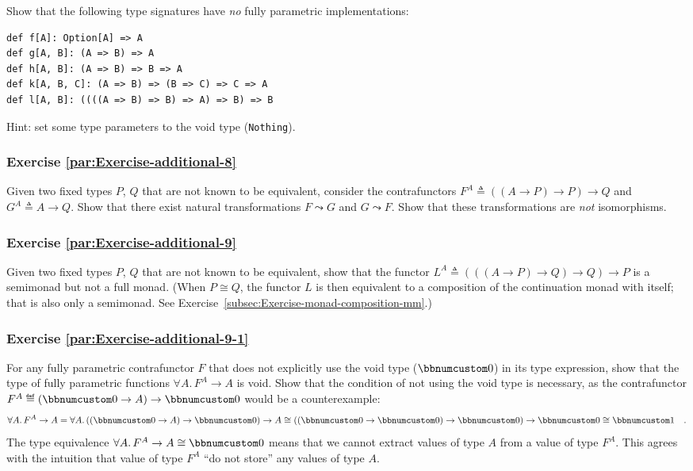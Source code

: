 Show that the following type signatures have \emph{no} fully parametric
implementations:

\begin{lstlisting}
def f[A]: Option[A] => A
def g[A, B]: (A => B) => A
def h[A, B]: (A => B) => B => A
def k[A, B, C]: (A => B) => (B => C) => C => A
def l[A, B]: ((((A => B) => B) => A) => B) => B
\end{lstlisting}

Hint: set some type parameters to the void type (\lstinline!Nothing!).

\subsubsection{Exercise \label{par:Exercise-additional-8}\ref{par:Exercise-additional-8}}

Given two fixed types $P$, $Q$ that are not known to be equivalent,
consider the contrafunctors $F^{A}\triangleq\left(\left(A\rightarrow P\right)\rightarrow P\right)\rightarrow Q$
and $G^{A}\triangleq A\rightarrow Q$. Show that there exist natural
transformations $F\leadsto G$ and $G\leadsto F$. Show that these
transformations are \emph{not} isomorphisms.

\subsubsection{Exercise \label{par:Exercise-additional-9}\ref{par:Exercise-additional-9}}

Given two fixed types $P$, $Q$ that are not known to be equivalent,
show that the functor $L^{A}\triangleq\left(\left(\left(A\rightarrow P\right)\rightarrow Q\right)\rightarrow Q\right)\rightarrow P$
is a semimonad but not a full monad. (When $P\cong Q$, the functor
$L$ is then equivalent to a composition of the continuation monad
with itself; that is also only a semimonad. See Exercise~\ref{subsec:Exercise-monad-composition-mm}.)

\subsubsection{Exercise \label{par:Exercise-additional-9-1}\ref{par:Exercise-additional-9-1}}

For any fully parametric contrafunctor $F$ that does not explicitly
use the void type ($\bbnum 0$) in its type expression,
show that the type of fully parametric functions $\forall A.\,F^{A}\rightarrow A$
is void. Show that the condition of not using the void type is necessary,
as the contrafunctor $F^{A}\triangleq(\bbnum 0\rightarrow A)\rightarrow\bbnum 0$
would be a counterexample:
\[
\forall A.\,F^{A}\rightarrow A=\forall A.\,((\bbnum 0\rightarrow A)\rightarrow\bbnum 0)\rightarrow A\cong((\bbnum 0\rightarrow\bbnum 0)\rightarrow\bbnum 0)\rightarrow\bbnum 0\cong\bbnum 1\quad.
\]
The type equivalence $\forall A.\,F^{A}\rightarrow A\cong\bbnum 0$
means that we cannot extract values of type $A$ from a value of type
$F^{A}$. This agrees with the intuition that value of type $F^{A}$
\textsf{``}do not store\textsf{''} any values of type $A$.

